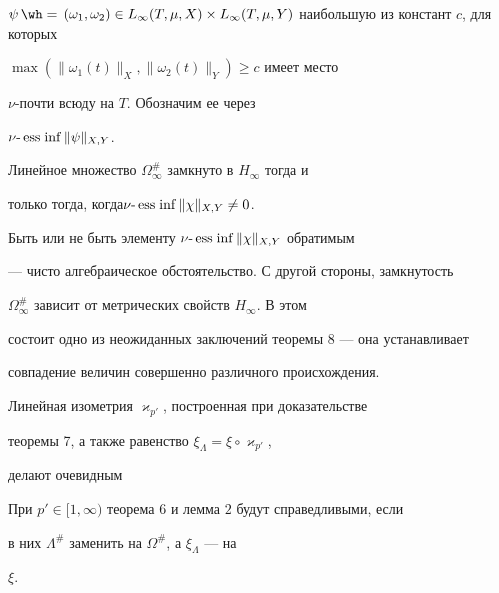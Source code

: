 $\psi\hateq(\omega_1,\omega_2)\in L_\infty(T,\mu,X)\times 


L_\infty(T,\mu,Y)$ наибольшую из констант $c$, для которых 


$\max(\|\omega_1(t)\|_X,\|\omega_2(t)\|_Y)\ge c$ имеет место 


$\nu$-почти всюду на $T$. Обозначим ее через 


$\nu\text{-}\operatorname{ess\;inf}\|\psi\|_{X,Y}$. 


 


\begin{thm} 


Линейное множество $\Omega^{\#}_\infty$ замкнуто в $H_\infty$ тогда и 


только тогда, когда\linebreak $\nu\text{-}\operatorname{ess\;inf}\|\chi\|_{X,Y}\ne0$. 


\end{thm} 


 


Быть или не быть элементу $\nu\text{-}\operatorname{ess\;inf}\|\chi\|_{X,Y}$ обратимым 


--- чисто алгебраическое обстоятельство. С другой стороны, замкнутость 


$\Omega^{\#}_\infty$ зависит от метрических свойств $H_\infty$. В этом 


состоит одно из неожиданных заключений теоремы 8 --- она устанавливает 


совпадение величин совершенно различного происхождения. 


 


Линейная изометрия $\varkappa_{p'}$, построенная при доказательстве 


теоремы 7, а также равенство $\xi_\Lambda=\xi\circ\varkappa_{p'}$, 


делают очевидным 


 


\begin{assrt} 


При $p'\in[1,\infty)$ теорема $6$ и лемма $2$ будут справедливыми, если 


в них $\Lambda^{\#}$ заменить на $\Omega^{\#}$, а $\xi_\Lambda$ --- на 


$\xi$. 


\end{assrt} 



